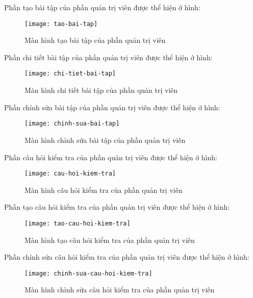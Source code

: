 \documentclass[../Thesis.tex]{subfiles}
\begin{document}
        Phần tạo bài tập của phần quản trị viên được thể hiện ở hình:
        \begin{figure}[ht!]
            \centering\texttt{[image: tao-bai-tap]}
            \caption{Màn hình tạo bài tập của phần quản trị viên}
            \label{fig:tao-bai-tap}
        \end{figure}

        Phần chi tiết bài tập của phần quản trị viên được thể hiện ở hình:
        \begin{figure}[ht!]
            \centering\texttt{[image: chi-tiet-bai-tap]}
            \caption{Màn hình chi tiết bài tập của phần quản trị viên}
            \label{fig:chi-tiet-bai-tap}
        \end{figure}

        Phần chỉnh sửa bài tập của phần quản trị viên được thể hiện ở hình:
        \begin{figure}[ht!]
            \centering\texttt{[image: chinh-sua-bai-tap]}
            \caption{Màn hình chỉnh sửa bài tập của phần quản trị viên}
            \label{fig:chinh-sua-bai-tap}
        \end{figure}

        Phần câu hỏi kiểm tra của phần quản trị viên được thể hiện ở hình:
        \begin{figure}[ht!]
            \centering\texttt{[image: cau-hoi-kiem-tra]}
            \caption{Màn hình câu hỏi kiểm tra của phần quản trị viên}
            \label{fig:cau-hoi-kiem-tra}
        \end{figure}

        Phần tạo câu hỏi kiểm tra của phần quản trị viên được thể hiện ở hình:
        \begin{figure}[ht!]
            \centering\texttt{[image: tao-cau-hoi-kiem-tra]}
            \caption{Màn hình tạo câu hỏi kiểm tra của phần quản trị viên}
            \label{fig:tao-cau-hoi-kiem-tra}
        \end{figure}

        Phần chỉnh sửa câu hỏi kiểm tra của phần quản trị viên được thể hiện ở hình:
        \begin{figure}[ht!]
            \centering\texttt{[image: chinh-sua-cau-hoi-kiem-tra]}
            \caption{Màn hình chỉnh sửa câu hỏi kiểm tra của phần quản trị viên}
            \label{fig:chinh-sua-cau-hoi-kiem-tra}
        \end{figure}
\end{document}
